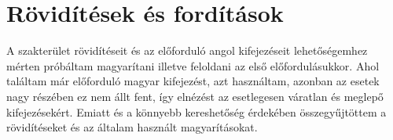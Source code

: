 \chapter*{Rövidítések és fordítások}
\label{sec:abbreviations}

A szakterület rövidítéseit és az előforduló angol kifejezéseit lehetőségemhez mérten  próbáltam magyarítani illetve feloldani az első előfordulásukkor.
Ahol találtam már előforduló magyar kifejezést, azt használtam, azonban az esetek nagy részében ez nem állt fent, így elnézést az esetlegesen váratlan és meglepő kifejezésekért.
Emiatt és a könnyebb kereshetőség érdekében összegyűjtöttem a rövidítéseket és az általam használt magyarításokat.

